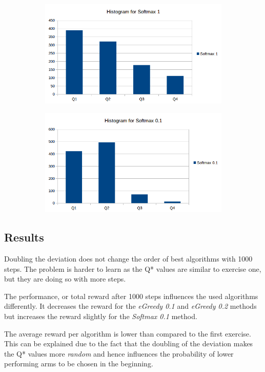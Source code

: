 \documentclass[a4paper, 11pt]{article}
\begin{document}
\begin{figure}[H]
\begin{subfigure}{.5\textwidth}
  \centering
  \includegraphics[width=1\linewidth]{ex1_2_histogram_softmax1}
\end{subfigure}%
\begin{subfigure}{.5\textwidth}
  \centering
  \includegraphics[width=1\linewidth]{ex1_2_histogram_softmax01}
\end{subfigure}%
\end{figure}

\subsection{Results}


Doubling the deviation does not change the order of best algorithms with 1000 steps. The problem is harder to learn as the Q* values are similar to exercise one, but they are doing so with more steps.

The performance, or total reward after 1000 steps influences the used algorithms differently. It decreases the reward for the \textit{eGreedy 0.1} and \textit{eGreedy 0.2} methods but increases the reward slightly for the \textit{Softmax 0.1} method.


The average reward per algorithm is lower than compared to the first exercise. This can be explained due to the fact that the doubling of the deviation makes the Q* values more \textit{random} and hence influences the probability of lower performing arms to be chosen in the beginning.
\end{document}
